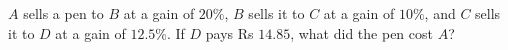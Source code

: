 $A$ sells a pen to $B$ at a gain of $20\%$, $B$ sells it to $C$ at a gain of $10\%$, and $C$ sells it to $D$ at a gain of $12.5\%$. If $D$ pays Rs $14.85$, what did the pen cost $A$?
